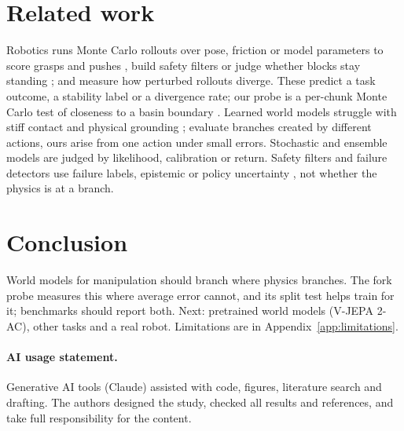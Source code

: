 \documentclass{article}
\begin{document}
\section{Related work}
Robotics runs Monte Carlo rollouts over pose, friction or model parameters to score grasps and pushes
\citep{mahler2017dexnet,agboh2018pushing}, build safety filters \citep{johansson2025safety,wang2026manidreams}
or judge whether blocks stay standing \citep{cannizzaro2024cobra,lerer2016learning};
\citet{goyal2026stability} and \citet{zapolsky2016particle} measure how perturbed rollouts diverge. These
predict a task outcome, a stability label or a divergence rate; our probe is a per-chunk Monte Carlo test
of closeness to a basin boundary \citep{menck2013basin}. Learned world models
\citep{sanchezgonzalez2020learning,allen2023fignet,zhou2025dinowm,assran2025vjepa2,hafner2025dreamerv3}
struggle with stiff contact \citep{parmar2021fundamental} and physical grounding
\citep{bear2021physion,motamed2026physicsiq,yang2026mirabench}; \citet{yu2026evaluated} evaluate branches
created by different actions, ours arise from one action under small errors. Stochastic and ensemble models
\citep{chua2018pets,lakshminarayanan2017ensembles} are judged by likelihood, calibration or return. Safety filters and failure detectors use failure labels, epistemic
or policy uncertainty \citep{nakamura2025generalizing,seo2025uncertainty,xu2025failure,agia2024unpacking},
not whether the physics is at a branch.

\section{Conclusion}\label{sec:conclusion}
World models for manipulation should branch where physics branches. The fork probe measures this where
average error cannot, and its split test helps train for it; benchmarks should report both. Next:
pretrained world models (V-JEPA 2-AC), other tasks and a real robot. Limitations are in Appendix~\ref{app:limitations}.

\paragraph{AI usage statement.} Generative AI tools (Claude) assisted with code, figures, literature
search and drafting. The authors designed the study, checked all results and references, and take full
responsibility for the content.



\appendix
\end{document}
